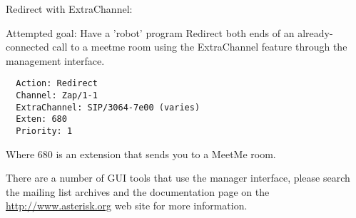 Redirect with ExtraChannel:

  Attempted goal:
  Have a 'robot' program Redirect both ends of an already-connected call
  to a meetme room using the ExtraChannel feature through the management interface.

\begin{verbatim}
  Action: Redirect
  Channel: Zap/1-1
  ExtraChannel: SIP/3064-7e00 (varies)
  Exten: 680
  Priority: 1
\end{verbatim}

Where 680 is an extension that sends you to a MeetMe room.

There are a number of GUI tools that use the manager interface, please search
the mailing list archives and the documentation page on the 
\url{http://www.asterisk.org} web site for more information.


